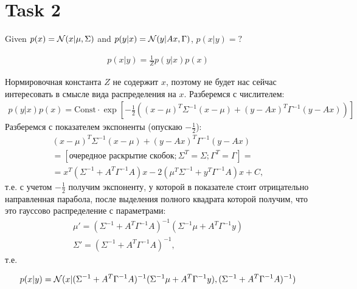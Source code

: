 \section{Task 2}

\begin{task}
    Given $p(x) = \mathcal{N}(x|\mu, \Sigma)$ and $p(y|x) = \mathcal{N}(y|Ax, \Gamma)$, $p(x|y) = ?$
\end{task}

\begin{solution}
    \begin{gather}
        p(x|y) = \frac{1}{Z} p(y|x)p(x)
    \end{gather}

    Нормировочная константа $Z$ не содержит $x$, поэтому не будет нас сейчас интересовать в смысле вида распределения на $x$. Разберемся с числителем:
    \begin{gather}
        p(y|x)p(x) = \text{Const} \cdot \exp[-\frac12 ((x - \mu)^T \Sigma^{-1} (x - \mu) + (y - Ax)^T \Gamma^{-1} (y - Ax))]
    \end{gather}
    Разберемся с показателем экспоненты (опускаю $-\frac12$):
    \begin{gather}
        (x - \mu)^T \Sigma^{-1} (x - \mu) + (y - Ax)^T \Gamma^{-1} (y - Ax) \\
        = [\text{очередное раскрытие скобок}; \Sigma^T = \Sigma; \Gamma^T = \Gamma] = \\
        = x^T (\Sigma^{-1} + A^T \Gamma^{-1} A) x - 2(\mu^T \Sigma^{-1} + y^T \Gamma^{-1} A) x + C,
    \end{gather}
    т.е. с учетом $-\frac12$ получим экспоненту, у которой в показателе стоит отрицательно направленная парабола, после выделения полного квадрата которой получим, что это гауссово распределение с параметрами:
    \begin{gather}
        \mu' = (\Sigma^{-1} + A^T \Gamma^{-1} A)^{-1}(\Sigma^{-1} \mu + A^T \Gamma^{-1} y) \\
        \Sigma' = (\Sigma^{-1} + A^T \Gamma^{-1} A)^{-1},
    \end{gather}
    т.е.

    \begin{equation}
        p(x|y) = \mathcal{N}(x|(\Sigma^{-1} + A^T \Gamma^{-1} A)^{-1}(\Sigma^{-1} \mu + A^T \Gamma^{-1} y), (\Sigma^{-1} + A^T \Gamma^{-1} A)^{-1})
    \end{equation}

\end{solution}

